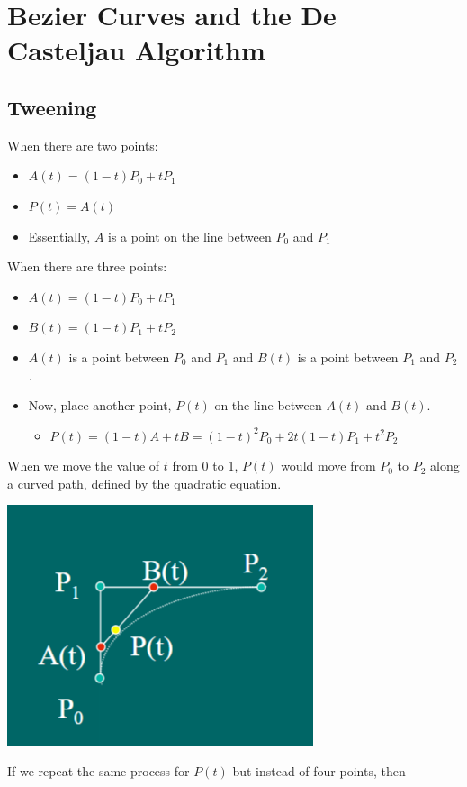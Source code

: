 \documentclass{article}
\begin{document}
\section*{Bezier Curves and the De Casteljau Algorithm}
\subsection*{Tweening}
When there are two points:
\begin{itemize}
    \item $A(t) = (1 - t) P_0 + tP_1$
    \item $P(t) = A(t)$
    \item Essentially, $A$ is a point on the line between $P_0$ and $P_1$
\end{itemize}
When there are three points:
\begin{itemize}
    \item $A(t) = (1 - t) P_0 + t P_1$
    \item $B(t) = (1 - t) P_1 + t P_2$
    \item $A(t)$ is a point between $P_0$ and $P_1$ and $B(t)$ is a point between $P_1$ and $P_2$.
    \item Now, place another point, $P(t)$ on the line between $A(t)$ and $B(t)$.
    \begin{itemize}
        \item $P(t) = (1 - t)A + tB = (1 - t)^2 P_0 + 2t(1-t) P_1 + t^2 P_2$
    \end{itemize}
\end{itemize}
When we move the value of $t$ from 0 to 1, $P(t)$ would move from $P_0$ to $P_2$ along a curved path, defined by the quadratic equation.
\begin{center}
    \includegraphics*[scale=1]{W3_3.png}
\end{center}
If we repeat the same process for $P(t)$ but instead of four points, then
\end{document}
